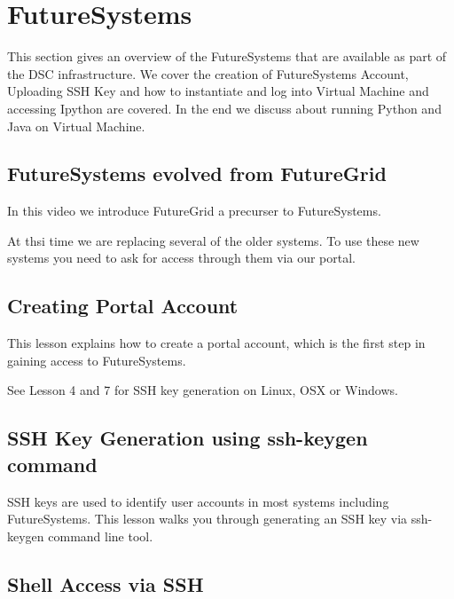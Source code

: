 

\chapter{FutureSystems}
\label{C:futuresystems}

\FILENAME

This section gives an overview of the FutureSystems that are available
as part of the DSC infrastructure. We cover the creation of 
FutureSystems Account, Uploading SSH Key and how to
instantiate and log into Virtual Machine and accessing Ipython are
covered. In the end we discuss about running Python and Java on Virtual
Machine.

\section{FutureSystems evolved from FutureGrid}

In this video we introduce FutureGrid a precurser to FutureSystems.


At thsi time we are replacing several of the older systems. To use
these new systems you need to ask for access through them via our portal.


\section{Creating Portal Account}

This lesson explains how to create a portal account, which is the first
step in gaining access to FutureSystems.

See Lesson 4 and 7 for SSH key generation on Linux, OSX or Windows.


\section{SSH Key Generation using ssh-keygen command}
\label{ssh-key-generation-using-ssh-keygen-command}

SSH keys are used to identify user accounts in most systems including
FutureSystems. This lesson walks you through generating an SSH key via
ssh-keygen command line tool.


\section{Shell Access via SSH}

